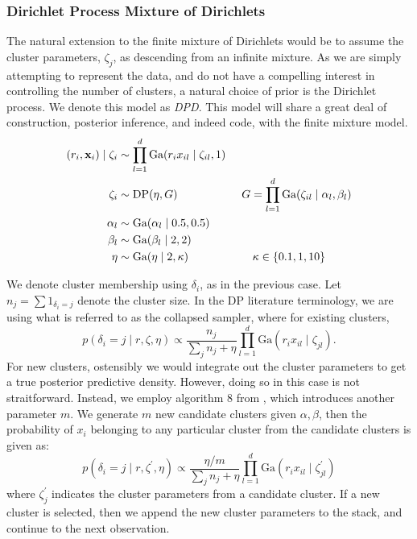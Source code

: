 \subsubsection{Dirichlet Process Mixture of Dirichlets}
\label{model:dpd}
The natural extension to the finite mixture of Dirichlets would be to assume the cluster parameters,
  $\zeta_j$, as descending from an infinite mixture.  As we are simply attempting to represent the
  data, and do not have a compelling interest in controlling the number of clusters, a natural
  choice of prior is the Dirichlet process.  We denote this model as \emph{DPD}.  This model will
  share a great deal of construction, posterior inference, and indeed code, with the finite
  mixture model.
  \begin{equation}
    \label{eq:dpsimplex}
    \begin{aligned}
      (r_i, {\bf x}_i) \mid \zeta_i &\sim \prod_{l = 1}^d\text{Ga}(r_ix_{il}\mid \zeta_{il}, 1)\\
      \zeta_i &\sim \text{DP}(\eta, G)\hspace{2cm}G = \prod_{l = 1}^d \text{Ga}(\zeta_{il}\mid \alpha_l,\beta_l)\\
      \alpha_l &\sim \text{Ga}(\alpha_l \mid 0.5, 0.5)\\
      \beta_l &\sim \text{Ga}(\beta_l \mid 2, 2)\\
      \eta &\sim \text{Ga}(\eta \mid 2, \kappa) \hspace{2cm}\kappa \in \lbrace 0.1, 1, 10\rbrace
    \end{aligned}
  \end{equation}

We denote cluster membership using $\delta_i$, as in the previous case.  Let
  $n_j = \sum 1_{\delta_i = j}$ denote the cluster size.  In the DP literature terminology, we
  are using what is referred to as the collapsed sampler, where for existing clusters,
  \begin{equation}
    p(\delta_i = j \mid r, \zeta, \eta) \propto \frac{n_j}{\sum_j n_j + \eta}
                \prod_{l = 1}^d\text{Ga}(r_ix_{il}\mid\zeta_{jl}).
  \end{equation}
For new clusters, ostensibly we would integrate out the cluster parameters to get a true
  posterior predictive density.  However, doing so in this case is not straitforward.  Instead,
  we employ algorithm 8 from \cite{neal2000}, which introduces another parameter $m$.  We
  generate $m$ new candidate clusters given $\alpha,\beta$, then the probability of $x_i$
  belonging to any particular cluster from the candidate clusters is given as:
  \begin{equation}
    p(\delta_i = j \mid r, \zeta^{\prime}, \eta) \propto \frac{\eta / m}{\sum_j n_j + \eta}
                \prod_{l = 1}^d\text{Ga}(r_ix_{il}\mid\zeta_{jl}^{\prime})
  \end{equation}
  where $\zeta_j^{\prime}$ indicates the cluster parameters from a candidate cluster.  If a new
  cluster is selected, then we append the new cluster parameters to the stack, and continue to the
  next observation.


